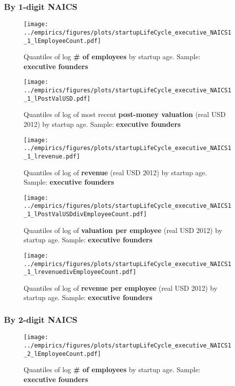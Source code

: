 \documentclass[12pt,english]{article}
\theoremstyle{remark}
\let\Oldsubsubsection\subsubsection
\renewcommand{\subsubsection}{\FloatBarrier\Oldsubsubsection}
\begin{document}
\subsubsection{By 1-digit NAICS}

\begin{figure}[!htb]
	\centering
	\texttt{[image: ../empirics/figures/plots/startupLifeCycle\_executive\_NAICS1\_1\_lEmployeeCount.pdf]}
	\caption{Quantiles of log \textbf{\# of employees} by startup age. 
		Sample: \textbf{executive founders}}
\end{figure}

\begin{figure}[!htb]
	\centering
	\texttt{[image: ../empirics/figures/plots/startupLifeCycle\_executive\_NAICS1\_1\_lPostValUSD.pdf]}
	\caption{Quantiles of log of most recent \textbf{post-money valuation} (real USD 2012) by startup age. 
		Sample: \textbf{executive founders}}
\end{figure}

\begin{figure}[!htb]
	\centering
	\texttt{[image: ../empirics/figures/plots/startupLifeCycle\_executive\_NAICS1\_1\_lrevenue.pdf]}
	\caption{Quantiles of log of \textbf{revenue} (real USD 2012) by startup age. 
		Sample: \textbf{executive founders}}
\end{figure}

\begin{figure}[!htb]
	\centering
	\texttt{[image: ../empirics/figures/plots/startupLifeCycle\_executive\_NAICS1\_1\_lPostValUSDdivEmployeeCount.pdf]}
	\caption{Quantiles of log of \textbf{valuation per employee} (real USD 2012) by startup age. 
		Sample: \textbf{executive founders}}
\end{figure}

\begin{figure}[!htb]
	\centering
	\texttt{[image: ../empirics/figures/plots/startupLifeCycle\_executive\_NAICS1\_1\_lrevenuedivEmployeeCount.pdf]}
	\caption{Quantiles of log of \textbf{revenue per employee} (real USD 2012) by startup age. 
		Sample: \textbf{executive founders}}
\end{figure}

\subsubsection{By 2-digit NAICS}

\begin{figure}[!htb]
	\centering
	\texttt{[image: ../empirics/figures/plots/startupLifeCycle\_executive\_NAICS1\_2\_lEmployeeCount.pdf]}
	\caption{Quantiles of log \textbf{\# of employees} by startup age. 
		Sample: \textbf{executive founders}}
\end{figure}
\end{document}
